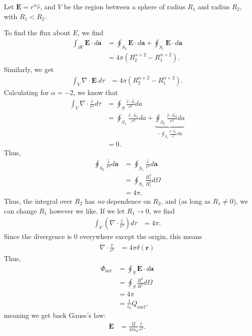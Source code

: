\documentclass[10pt]{mypackage}
\begin{document}
\begin{example}
  Let $\mathbf{E} = r^{\alpha}\widehat{r}$, and $V$ be the region between a sphere of radius $R_1$ and radius $R_2$, with $R_1 < R_2$.\newline

  To find the flux about $E$, we find
  \begin{align*}
    \int_{\partial V}^{} \mathbf{E}\cdot d\mathbf{a} &= \oint_{S_2}\mathbf{E}\cdot d\mathbf{a} + \oint_{S_1} \mathbf{E}\cdot d\mathbf{a}\\
                                            &= 4\pi \left(R_2^{\alpha + 2} - R_{1}^{\alpha + 2}\right).
  \end{align*}
  Similarly, we get
  \begin{align*}
    \int_{V}^{} \nabla \cdot \mathbf{E}\:d\tau &= 4\pi\left(R_2^{\alpha + 2} - R_1^{\alpha + 2}\right).
  \end{align*}
  Calculating for $\alpha = -2$, we know that
  \begin{align*}
    \int_{V}\nabla \cdot \frac{\widehat{r}}{r^2}d\tau &= \oint_{S}\frac{\widehat{r}\cdot \widehat{n}}{r^2}da\\
                                                  &= \oint_{S_1}\frac{\widehat{r}\cdot \widehat{n}_1}{r^2}da + \underbrace{\oint_{S_2}\frac{\widehat{r}\cdot \widehat{n}_2}{r^2}da}_{-\oint_{S_1}\frac{\widehat{r}\cdot \widehat{n}_1}{r^2}da}\\
                                                  &= 0.
  \end{align*}
  Thus,
  \begin{align*}
    \oint_{S_2}\frac{\widehat{r}}{r^2}d\mathbf{a} &= \oint_{S_1}\frac{\widehat{r}}{r^2}d\mathbf{a}\\
                                              &= \oint_{S_1}\frac{R_1^{2}}{R_1^2}d\Omega\\
                                              &= 4\pi.
  \end{align*}
  Thus, the integral over $R_2$ has \textit{no} dependence on $R_2$, and (as long as $R_1\neq 0$), we can change $R_1$ however we like. If we let $R_1\rightarrow 0$, we find
  \begin{align*}
    \int_{V}\left(\nabla \cdot \frac{\widehat{r}}{r^2}\right)d\tau &= 4\pi.
  \end{align*}
  Since the divergence is $0$ everywhere except the origin, this means
  \begin{align*}
    \nabla \cdot \frac{\widehat{r}}{r^2} &= 4\pi \delta\left(\mathbf{r}\right)
  \end{align*}
  Thus,
  \begin{align*}
    \Phi_{\text{net}} &= \oint_{S}\mathbf{E}\cdot d\mathbf{a}\\
                      &= \oint_{S}\frac{R^2}{R^2}d\Omega\\
                      &= 4\pi\\
                      &= \frac{1}{\epsilon_0}Q_{\text{encl}},
  \end{align*}
  meaning we get back Gauss's law:
  \begin{align*}
    \mathbf{E} &= \frac{Q}{4\pi\epsilon_0}\frac{\widehat{r}}{r^2}.
  \end{align*}
\end{example}
\end{document}
